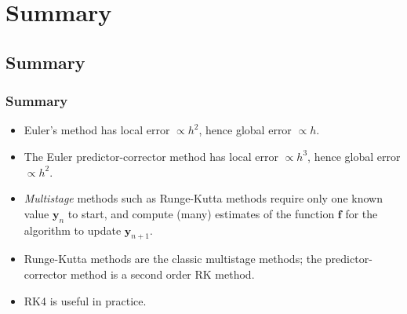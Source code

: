 \documentclass{beamer}
\newcommand{\by}{{\boldsymbol{y}}}
\newcommand{\bfm}[1]{{\boldsymbol{#1}}}
\begin{document}
\section{Summary}

\subsection{Summary}

\begin{frame}
  \frametitle{Summary}

  \begin{itemize}
  \item Euler's method has local error $\propto h^2$, hence global
    error $\propto h$.
  \item The Euler predictor-corrector method has local error $\propto
    h^3$, hence global error $\propto h^2$.
  \item \emph{Multistage} methods such as Runge-Kutta methods require
    only one known value $\by_{n}$ to start, and compute (many)
    estimates of the function $\bfm{f}$ for the algorithm to update
    $\by_{n+1}$.
  \item Runge-Kutta methods are the classic multistage methods; the
    predictor-corrector method is a second order RK method.
  \item RK4 is useful in practice.
  \end{itemize}

\end{frame}
\end{document}
